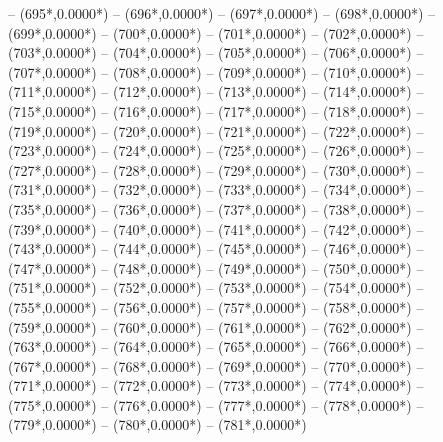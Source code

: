 {		-- ({695*\dx},{0.0000*\dy})
		-- ({696*\dx},{0.0000*\dy})
		-- ({697*\dx},{0.0000*\dy})
		-- ({698*\dx},{0.0000*\dy})
		-- ({699*\dx},{0.0000*\dy})
		-- ({700*\dx},{0.0000*\dy})
		-- ({701*\dx},{0.0000*\dy})
		-- ({702*\dx},{0.0000*\dy})
		-- ({703*\dx},{0.0000*\dy})
		-- ({704*\dx},{0.0000*\dy})
		-- ({705*\dx},{0.0000*\dy})
		-- ({706*\dx},{0.0000*\dy})
		-- ({707*\dx},{0.0000*\dy})
		-- ({708*\dx},{0.0000*\dy})
		-- ({709*\dx},{0.0000*\dy})
		-- ({710*\dx},{0.0000*\dy})
		-- ({711*\dx},{0.0000*\dy})
		-- ({712*\dx},{0.0000*\dy})
		-- ({713*\dx},{0.0000*\dy})
		-- ({714*\dx},{0.0000*\dy})
		-- ({715*\dx},{0.0000*\dy})
		-- ({716*\dx},{0.0000*\dy})
		-- ({717*\dx},{0.0000*\dy})
		-- ({718*\dx},{0.0000*\dy})
		-- ({719*\dx},{0.0000*\dy})
		-- ({720*\dx},{0.0000*\dy})
		-- ({721*\dx},{0.0000*\dy})
		-- ({722*\dx},{0.0000*\dy})
		-- ({723*\dx},{0.0000*\dy})
		-- ({724*\dx},{0.0000*\dy})
		-- ({725*\dx},{0.0000*\dy})
		-- ({726*\dx},{0.0000*\dy})
		-- ({727*\dx},{0.0000*\dy})
		-- ({728*\dx},{0.0000*\dy})
		-- ({729*\dx},{0.0000*\dy})
		-- ({730*\dx},{0.0000*\dy})
		-- ({731*\dx},{0.0000*\dy})
		-- ({732*\dx},{0.0000*\dy})
		-- ({733*\dx},{0.0000*\dy})
		-- ({734*\dx},{0.0000*\dy})
		-- ({735*\dx},{0.0000*\dy})
		-- ({736*\dx},{0.0000*\dy})
		-- ({737*\dx},{0.0000*\dy})
		-- ({738*\dx},{0.0000*\dy})
		-- ({739*\dx},{0.0000*\dy})
		-- ({740*\dx},{0.0000*\dy})
		-- ({741*\dx},{0.0000*\dy})
		-- ({742*\dx},{0.0000*\dy})
		-- ({743*\dx},{0.0000*\dy})
		-- ({744*\dx},{0.0000*\dy})
		-- ({745*\dx},{0.0000*\dy})
		-- ({746*\dx},{0.0000*\dy})
		-- ({747*\dx},{0.0000*\dy})
		-- ({748*\dx},{0.0000*\dy})
		-- ({749*\dx},{0.0000*\dy})
		-- ({750*\dx},{0.0000*\dy})
		-- ({751*\dx},{0.0000*\dy})
		-- ({752*\dx},{0.0000*\dy})
		-- ({753*\dx},{0.0000*\dy})
		-- ({754*\dx},{0.0000*\dy})
		-- ({755*\dx},{0.0000*\dy})
		-- ({756*\dx},{0.0000*\dy})
		-- ({757*\dx},{0.0000*\dy})
		-- ({758*\dx},{0.0000*\dy})
		-- ({759*\dx},{0.0000*\dy})
		-- ({760*\dx},{0.0000*\dy})
		-- ({761*\dx},{0.0000*\dy})
		-- ({762*\dx},{0.0000*\dy})
		-- ({763*\dx},{0.0000*\dy})
		-- ({764*\dx},{0.0000*\dy})
		-- ({765*\dx},{0.0000*\dy})
		-- ({766*\dx},{0.0000*\dy})
		-- ({767*\dx},{0.0000*\dy})
		-- ({768*\dx},{0.0000*\dy})
		-- ({769*\dx},{0.0000*\dy})
		-- ({770*\dx},{0.0000*\dy})
		-- ({771*\dx},{0.0000*\dy})
		-- ({772*\dx},{0.0000*\dy})
		-- ({773*\dx},{0.0000*\dy})
		-- ({774*\dx},{0.0000*\dy})
		-- ({775*\dx},{0.0000*\dy})
		-- ({776*\dx},{0.0000*\dy})
		-- ({777*\dx},{0.0000*\dy})
		-- ({778*\dx},{0.0000*\dy})
		-- ({779*\dx},{0.0000*\dy})
		-- ({780*\dx},{0.0000*\dy})
		-- ({781*\dx},{0.0000*\dy})
}
